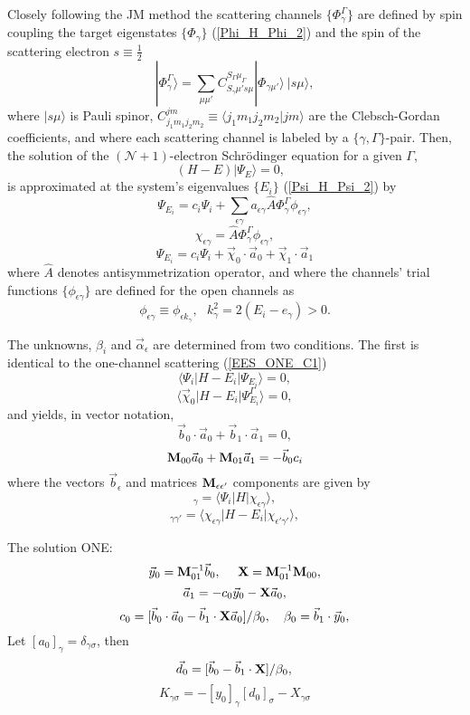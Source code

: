 \documentclass[aip
, pra
, showpacs
, aps
, twocolumn
, groupedaddress
, floatfix
]{revtex4}
\newcommand{\beq}{\begin{equation}}
\newcommand{\eeq}{\end{equation}}
\begin{document}
Closely following the JM method \cite{BR76p1491, KFB11} the scattering channels $\{\Phi_\gamma^\Gamma\}$ are defined by spin coupling the target eigenstates
$\{\Phi_\gamma\}$ (\ref{Phi_H_Phi_2})
and the spin of the scattering electron
$s\equiv \frac{1}{2}$
\beq
| \Phi_{\gamma}^{\Gamma} \rangle = \sum_{\mu \mu'}
C_{S_\gamma \mu' s \mu}^{S_\Gamma \mu_\Gamma}
|\Phi_{\gamma \mu'} \rangle \ |s \mu  \rangle,
\label{chi_phi_Gamma} \eeq
where $|s \mu \rangle$ is Pauli spinor,
$C_{j_1m_1j_2m_2}^{jm} \equiv \langle j_1m_1 j_2 m_2| jm\rangle$ are the Clebsch-Gordan coefficients,
and where each scattering channel is labeled by a $\{\gamma, \Gamma\}$-pair.
Then, the solution of the $(\mathcal{N}+1)$-electron Schr\"odinger equation for a given $\Gamma$,
\beq
(H-E) | \Psi_E \rangle =0,  \ \ \  \label{H_E_Psi_E_2}
\eeq
is approximated at the system's eigenvalues $\{E_i\}$ (\ref{Psi_H_Psi_2}) by
\beq
 \Psi_{E_i}  =  c_i \Psi_i
+ \sum_{\epsilon \gamma}   a_{\epsilon \gamma}
\hat{A} \Phi^\Gamma_{\gamma}  \phi_{\epsilon \gamma} ,
\eeq
\beq
\chi_{\epsilon \gamma} = \hat{A} \Phi^\Gamma_{\gamma}  \phi_{\epsilon \gamma},
\eeq
\beq
 \Psi_{E_i}  =  c_i \Psi_i
+ \vec{\chi}_0 \cdot \vec{a}_0   + \vec{\chi}_1 \cdot \vec{a}_1
\eeq
where $\hat{A}$ denotes antisymmetrization operator,
and where the channels' trial functions $\{ \phi_{\epsilon \gamma} \}$ are defined for the open channels as
\beq
\phi_{\epsilon \gamma}\equiv \phi_{\epsilon k_\gamma}, \ \ \   k_{\gamma}^2 = 2(E_i - e_\gamma) > 0.
\eeq


The unknowns, $\beta_i$ and $\vec{\alpha}_\epsilon$ are determined from two conditions. The first is identical to the one-channel scattering (\ref{EES_ONE_C1})
\beq
\langle\Psi_i|H-E_i|\Psi_{E_i}\rangle=0,
\label{EES_MC_C1} \eeq  %
\beq
\langle \vec{\chi}_{0} |H-E_i|\Psi_{E_i}^{\Gamma}\rangle=0,
\label{EES_MC_C2} \eeq  %
and yields, in vector notation,
\beq
\vec{b}_0 \cdot \vec{a}_0 + \vec{b}_1 \cdot \vec{a}_1 = 0, \label{CK_s}
\eeq
\beq
{\bf M}_{00} \vec{a}_0 + {\bf M}_{01} \vec{a}_1 = -  \vec{b}_0 c_i
\eeq
where the vectors $\vec{b}_\epsilon$ and matrices ${\bf M}_{\epsilon\epsilon'}$ components are given by
\beq
[b_{\epsilon}]_{\gamma}
= \langle \Psi_i |H| \chi_{\epsilon \gamma} \rangle,
\eeq
\beq
[M_{\epsilon \epsilon'}]_{\gamma \gamma'} = \langle \chi_{\epsilon \gamma}  | H-E_i |
\chi_{\epsilon' \gamma'} \rangle,
\label{Y_B_W} \eeq


The solution ONE:
\beq
\vec{y}_0 = {\bf M}_{01}^{-1} \vec{b}_0, \ \ \ \ 
{\bf X} = {\bf M}_{01}^{-1} {\bf M}_{00}, 
\eeq
\beq
\vec{a}_1= - c_0 \vec{y}_0   - {\bf X} \vec{a}_0,
\eeq
\beq
c_0 = [ \vec{b}_0 \cdot \vec{a}_0
- \vec{b}_1 \cdot {\bf X} \vec{a}_0 ]  / \beta_0 ,\ \ \ 
\beta_0 = \vec{b}_1 \cdot  \vec{y}_0,
\eeq
Let $[a_0]_\gamma = \delta_{\gamma \sigma}$, then
\beq
\vec{d}_0 = [ \vec{b}_0
- \vec{b}_1 \cdot {\bf X} ]  / \beta_0 ,\\
\eeq
\beq
K_{\gamma \sigma}= - [y_0]_\gamma [d_0]_\sigma   - X_{\gamma \sigma}
\eeq
\end{document}
